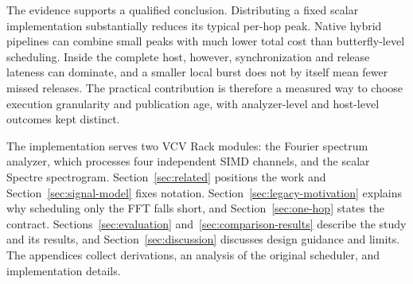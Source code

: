 The evidence supports a qualified conclusion. Distributing a fixed scalar
implementation substantially reduces its typical per-hop peak. Native hybrid
pipelines can combine small peaks with much lower total cost than
butterfly-level scheduling. Inside the complete host, however,
synchronization and release lateness can dominate, and a smaller local burst
does not by itself mean fewer missed releases. The practical contribution is
therefore a measured way to choose execution granularity and publication age,
with analyzer-level and host-level outcomes kept distinct.

The implementation serves two VCV Rack modules: the Fourier spectrum analyzer,
which processes four independent SIMD channels, and the scalar Spectre
spectrogram. Section~\ref{sec:related} positions the work and
Section~\ref{sec:signal-model} fixes notation. Section~\ref{sec:legacy-motivation}
explains why scheduling only the FFT falls short, and Section~\ref{sec:one-hop}
states the contract. Sections~\ref{sec:evaluation}
and~\ref{sec:comparison-results} describe the study and its results, and
Section~\ref{sec:discussion} discusses design guidance and limits. The
appendices collect derivations, an analysis of the original scheduler, and
implementation details.
